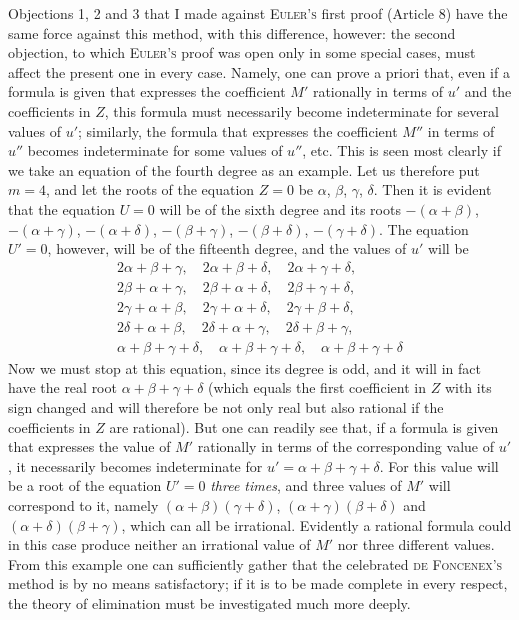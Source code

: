 Objections 1, 2 and 3 that I made against \textsc{Euler's} first proof (Article 8) have the same force against this method, with this difference, however: the second objection, to which \textsc{Euler's} proof was open only in some special cases, must affect the present one in every case. Namely, one can prove a priori that, even if a formula is given that expresses the coefficient $M'$ rationally in terms of $u'$ and the coefficients in $Z$, this formula must necessarily become indeterminate for several values of $u'$; similarly, the formula that expresses the coefficient $M''$ in terms of $u''$ becomes indeterminate for some values of $u''$, etc. This is seen most clearly if we take an equation of the fourth degree as an example. Let us therefore put $m=4$, and let the roots of the equation $Z=0$ be $\alpha$, $\beta$, $\gamma$, $\delta$. Then it is evident that the equation $U=0$ will be of the sixth degree and its roots $-(\alpha+\beta)$, $-(\alpha+\gamma)$, $-(\alpha+\delta)$, $-(\beta+\gamma)$, $-(\beta+\delta)$, $-(\gamma+\delta)$. The equation $U'=0$, however, will be of the fifteenth degree, and the values of $u'$ will be
\[
\begin{gathered}
2\alpha+\beta+\gamma,\quad 2\alpha+\beta+\delta,\quad 2\alpha+\gamma+\delta,\\
2\beta+\alpha+\gamma,\quad 2\beta+\alpha+\delta,\quad 2\beta+\gamma+\delta,\\
2\gamma+\alpha+\beta,\quad 2\gamma+\alpha+\delta,\quad 2\gamma+\beta+\delta,\\
2\delta+\alpha+\beta,\quad 2\delta+\alpha+\gamma,\quad 2\delta+\beta+\gamma,\\
\alpha+\beta+\gamma+\delta,\quad\alpha+\beta+\gamma+\delta,\quad\alpha+\beta+\gamma+\delta
\end{gathered}
\]
Now we must stop at this equation, since its degree is odd, and it will in fact have the real root $\alpha+\beta+\gamma+\delta$ (which equals the first coefficient in $Z$ with its sign changed and will therefore be not only real but also rational if the coefficients in $Z$ are rational). But one can readily see that, if a formula is given that expresses the value of $M'$ rationally in terms of the corresponding value of $u'$, it necessarily becomes indeterminate for $u'=\alpha+\beta+\gamma+\delta$. For this value will be a root of the equation $U'=0$ \textit{three times}, and three values of $M'$ will correspond to it, namely $(\alpha+\beta)(\gamma+\delta)$, $(\alpha+\gamma)(\beta+\delta)$ and $(\alpha+\delta)(\beta+\gamma)$, which can all be irrational. Evidently a rational formula could in this case produce neither an irrational value of $M'$ nor three different values. From this example one can sufficiently gather that the celebrated \textsc{de Foncenex's} method is by no means satisfactory; if it is to be made complete in every respect, the theory of elimination must be investigated much more deeply.

